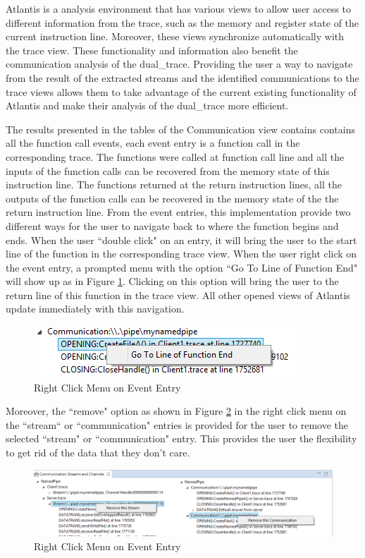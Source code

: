 Atlantis is a analysis environment that has various views to allow user access to different information from the trace, such as the memory and register state of the current instruction line. Moreover, these views synchronize automatically with the trace view. These functionality and information also benefit the communication analysis of the dual\_trace. Providing the user a way to navigate from the result of the extracted streams and the identified communications to the trace views allows them to take advantage of the current existing functionality of Atlantis and make their analysis of the dual\_trace more efficient.

The results presented in the tables of the Communication view contains contains all the function call events, each event entry is a function call in the corresponding trace. The functions were called at function call line and all the inputs of the function calls can be recovered from the memory state of this instruction line. The functions returned at the return instruction lines, all the outputs of the function calls can be recovered in the memory state of the the return instruction line. From the event entries, this implementation provide two different ways for the user to navigate back to where the function begins and ends. When the user ``double click" on an entry, it will bring the user to the start line of the function in the corresponding trace view. When the user right click on the event entry, a prompted menu with the option ``Go To Line of Function End" will show up as in Figure \ref{gotoend}. Clicking on this option will bring the user to the return line of this function in the trace view. All other opened views of Atlantis update immediately with this navigation. 

\begin{figure}[H]
\centerline{\includegraphics{Figures/gotoend}}
 \caption{Right Click Menu on Event Entry}
\label{gotoend}
\end{figure}

Moreover, the ``remove" option as shown in Figure \ref{remove} in the right click menu on the ``stream“ or ``communication" entries is provided for the user to remove the selected ``stream" or ``communication" entry. This provides the user the flexibility to get rid of the data that they don't care.

\begin{figure}[H]
\centerline{\includegraphics[scale=0.7]{Figures/remove}}
 \caption{Right Click Menu on Event Entry}
\label{remove}
\end{figure}

